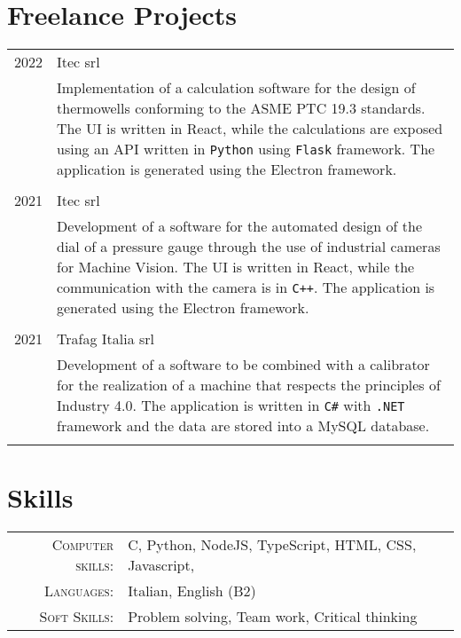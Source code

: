 \documentclass[a4paper, 12pt]{article}
\begin{document}
  \bigskip
  \section{Freelance Projects}
  \begin{tabular}{r|p{14cm}}
    \textsc{2022} & Itec srl \\ & \footnotesize{Implementation of a calculation
    software for the design of thermowells conforming to the ASME PTC 19.3
    standards. The UI is written in React, while the calculations are exposed
    using an API written in \verb!Python! using \verb!Flask! framework. The
    application is generated using the Electron framework.}\\
    \multicolumn{2}{c}{}\\

    \textsc{2021} & Itec srl \\ & \footnotesize{Development of a software for
    the automated design of the dial of a pressure gauge through the use of
    industrial cameras for Machine Vision. The UI is written in React, while the
    communication with the camera is in \verb!C++!. The application is generated
    using the Electron framework.} \\ \multicolumn{2}{c}{}\\

    \textsc{2021} & Trafag Italia srl \\ & \footnotesize{Development of a
    software to be combined with a calibrator for the realization of a machine
    that respects the principles of Industry 4.0. The application is written in
    \verb!C#! with \verb!.NET! framework and the data are stored into a MySQL
    database.} \\ \multicolumn{2}{c}{}\\
  \end{tabular}

  \bigskip
  \section{Skills}
    \begin{tabular}{rl}
      \textsc{Computer skills:}& C, Python, NodeJS, TypeScript, HTML, CSS, Javascript, \\
      \textsc{Languages:}& Italian, English (B2)\normalsize\\
      \textsc{Soft Skills:}& Problem solving, Team work, Critical thinking\\
    \end{tabular}
\end{document}
